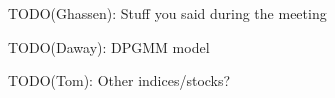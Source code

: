 
TODO(Ghassen): Stuff you said during the meeting

TODO(Daway): DPGMM model

TODO(Tom): Other indices/stocks?

